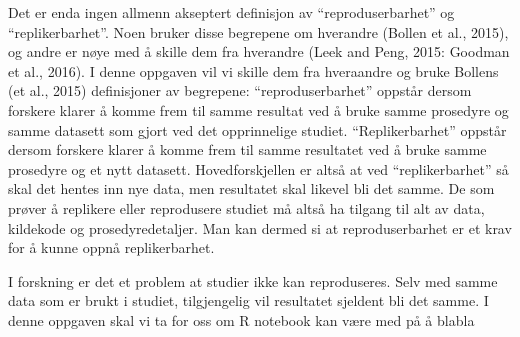 \documentclass[
]{article}
\begin{document}
Det er enda ingen allmenn akseptert definisjon av ``reproduserbarhet''
og ``replikerbarhet''. Noen bruker disse begrepene om hverandre (Bollen
et al., 2015), og andre er nøye med å skille dem fra hverandre (Leek and
Peng, 2015: Goodman et al., 2016). I denne oppgaven vil vi skille dem
fra hveraandre og bruke Bollens (et al., 2015) definisjoner av
begrepene: ``reproduserbarhet'' oppstår dersom forskere klarer å komme
frem til samme resultat ved å bruke samme prosedyre og samme datasett
som gjort ved det opprinnelige studiet. ``Replikerbarhet'' oppstår
dersom forskere klarer å komme frem til samme resultatet ved å bruke
samme prosedyre og et nytt datasett. Hovedforskjellen er altså at ved
``replikerbarhet'' så skal det hentes inn nye data, men resultatet skal
likevel bli det samme. De som prøver å replikere eller reprodusere
studiet må altså ha tilgang til alt av data, kildekode og
prosedyredetaljer. Man kan dermed si at reproduserbarhet er et krav for
å kunne oppnå replikerbarhet.

I forskning er det et problem at studier ikke kan reproduseres. Selv med
samme data som er brukt i studiet, tilgjengelig vil resultatet sjeldent
bli det samme. I denne oppgaven skal vi ta for oss om R notebook kan
være med på å blabla
\end{document}
